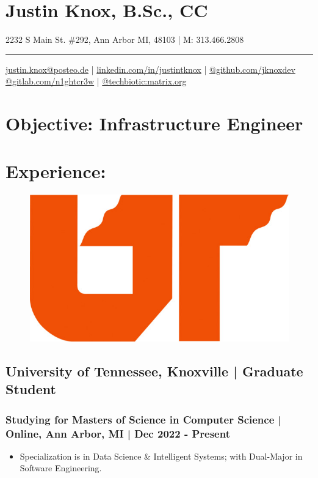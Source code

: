 \documentclass[letter,10pt]{article}
\author{arx}
\date{\today}
\title{}
\begin{document}
\section*{Justin Knox, B.Sc., CC}
\label{sec:orge7aadb4}
2232 S Main St. \#292, Ann Arbor MI, 48103 | M: 313.466.2808

\noindent\rule{\textwidth}{0.5pt}
\href{mailto:justin.knox@posteo.de}{justin.knox@posteo.de} | \href{https://www.linkedin.com/in/justintknox}{linkedin.com/in/justintknox} | \href{https://www.github.com/jknoxdev}{@github.com/jknoxdev} \\
\href{https://gitlab.com/n1ghtcr3w}{@gitlab.com/n1ghtcr3w} | \href{https://matrix.to/\#/@techbiotic:matrix.org}{@techbiotic:matrix.org} 


\section*{Objective:              Infrastructure Engineer}
\label{sec:org8f19dfc}
\section*{Experience:}
\label{sec:org6520106}
\begin{figure}
\includegraphics[width=0.45\linewidth]{./img/50p_cr_utk.jpg}
\end{figure}

\subsection*{University of Tennessee, Knoxville | Graduate Student}
\label{sec:org74fad9f}
\subsubsection*{Studying for Masters of Science in Computer Science | Online, Ann Arbor, MI | Dec 2022 - Present}
\label{sec:orgb790e92}
\begin{itemize}
\item Specialization is in Data Science \& Intelligent Systems; with Dual-Major in Software Engineering.
\end{itemize}
\end{document}

